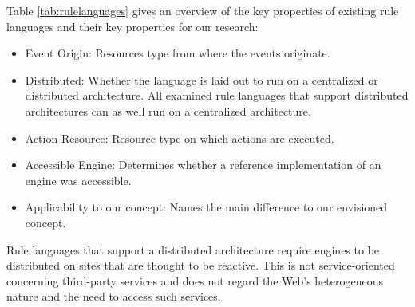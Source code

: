 Table \ref{tab:rulelanguages} gives an overview of the key properties of existing rule languages and their key properties for our research:
\begin{itemize}
  \item \textrm{Event Origin}: Resources type from where the events originate.
  \item \textrm{Distributed}: Whether the language is laid out to run on a centralized or distributed architecture. All examined rule languages that support distributed architectures can as well run on a centralized architecture.
  \item \textrm{Action Resource}: Resource type on which actions are executed.
  \item \textrm{Accessible Engine}: Determines whether a reference implementation of an engine was accessible.
  \item \textrm{Applicability to our concept}: Names the main difference to our envisioned concept.
\end{itemize}
Rule languages that support a distributed architecture require engines to be distributed on sites that are thought to be reactive.
This is not service-oriented concerning third-party services and does not regard the Web's heterogeneous nature and the need to access such services.

